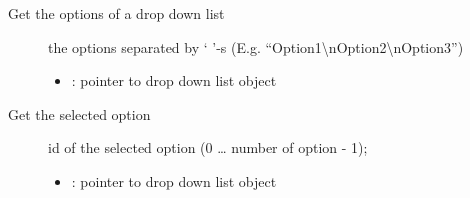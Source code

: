\documentclass[letterpaper,10pt,english]{sphinxmanual}
\begin{document}

\begin{fulllineitems}
\label{\detokenize{object-types/ddlist:_CPPv421lv_ddlist_get_optionsPK8lv_obj_t}}%
\pysigstartmultiline
{}\label{\detokenize{object-types/ddlist:lv__ddlist_8h_1af817d64d53a452af52f0c3e5c3f57f00}}%
\pysigstopmultiline
Get the options of a drop down list \begin{description}
\item[{}] \leavevmode
the options separated by ‘
’-s (E.g. “Option1\textbackslash{}nOption2\textbackslash{}nOption3”) 


\item[{}] \leavevmode\begin{itemize}
\item {} 
: pointer to drop down list object 

\end{itemize}

\end{description}


\end{fulllineitems}


\begin{fulllineitems}
\label{\detokenize{object-types/ddlist:_CPPv422lv_ddlist_get_selectedPK8lv_obj_t}}%
\pysigstartmultiline
{}\label{\detokenize{object-types/ddlist:lv__ddlist_8h_1a5d212068816b3e1439687144dbac0584}}%
\pysigstopmultiline
Get the selected option \begin{description}
\item[{}] \leavevmode
id of the selected option (0 … number of option - 1); 

\item[{}] \leavevmode\begin{itemize}
\item {} 
: pointer to drop down list object 

\end{itemize}

\end{description}


\end{fulllineitems}
\end{document}
